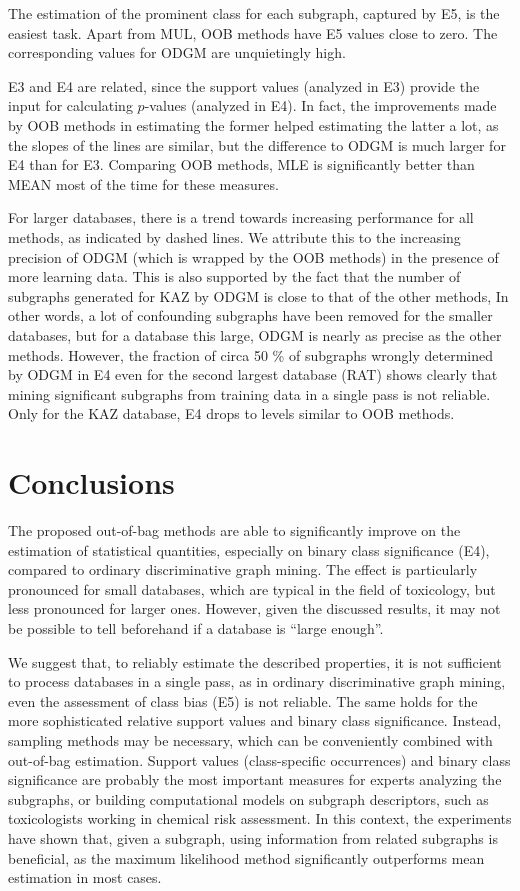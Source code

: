 \documentclass{sig-alternate}
\begin{document}
The estimation of the prominent class for each subgraph, captured by E5, is
the easiest task. Apart from MUL, OOB methods have E5 values close to
zero. The corresponding values for ODGM are unquietingly high.

E3 and E4 are related, since the support values (analyzed in E3) provide the input
for calculating $p$-values (analyzed in E4). 
In fact, the improvements made by OOB methods in estimating the former helped estimating 
the latter a lot, as the slopes of the lines are similar, but the difference
to ODGM is much larger for E4 than for E3. Comparing OOB methods, MLE is significantly 
better than MEAN most of the time for these measures.

For larger databases, there is a trend towards increasing performance for all
methods, as indicated by dashed lines.  We attribute this to the increasing
precision of ODGM (which is wrapped by the OOB methods) in the presence of more
learning data. This is also supported by the fact that the number of subgraphs 
generated for KAZ by ODGM is close to that of the other methods,
In other words, a lot of confounding subgraphs have been removed for the smaller databases,
but for a database this large, ODGM is nearly as precise as the other methods.
However, the fraction of
circa 50 \% of subgraphs wrongly determined by ODGM in E4 even for the second
largest database (RAT) shows clearly that mining significant subgraphs from training
data in a single pass is not reliable. Only for the KAZ database, E4 drops to levels
similar to OOB methods.

\section{Conclusions}
\label{s:Conclusion}
The proposed out-of-bag methods are able to significantly improve on the estimation of
statistical quantities, especially on binary class significance (E4), compared to ordinary
discriminative graph mining. The effect is particularly pronounced for small
databases, which are typical in the field of toxicology, but less pronounced for larger ones. 
However, given the discussed results, it may not be possible to tell beforehand if a database is ``large enough''.

We suggest that, to reliably estimate the described properties,
it is not sufficient to process databases in a single pass, as in
ordinary discriminative graph mining, even the assessment of class bias (E5) is
not reliable. 
The same holds for the more sophisticated relative support values and binary class significance.
Instead, sampling methods may be necessary, which can be conveniently combined with out-of-bag estimation.
Support values (class-specific occurrences) and binary class significance are probably the
most important measures for experts analyzing the subgraphs, or building computational models on subgraph descriptors, 
such as toxicologists working in chemical risk assessment. 
In this context, the experiments have shown that, given a subgraph, using information from related subgraphs is beneficial, as the maximum
likelihood method significantly outperforms mean estimation in most cases.




\end{document}
